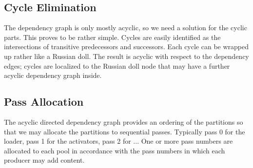 \documentclass{llncs}
\begin{document}



\subsection{Cycle Elimination}

The dependency graph is only mostly acyclic, so we need a solution for the cyclic parts. This proves to be rather simple. Cycles are easily identified as the intersections of transitive predecessors and successors. Each cycle can be wrapped up rather like a Russian doll. The result is acyclic with respect to the dependency edges; cycles are localized to the Russian doll node that may have a further acyclic dependency graph inside. 

\subsection{Pass Allocation}

The acyclic directed dependency graph provides an ordering of the partitions so that we may allocate the partitions to sequential passes. Typically pass 0 for the loader, pass 1 for the activators, pass 2 for ... 
One or more pass numbers are allocated to each pool in accordance with the pass numbers in which each producer may add content.
\end{document}
